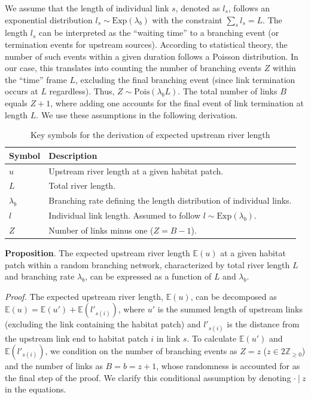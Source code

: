 \documentclass[11pt, class=article, crop=false]{standalone}
\begin{document}
We assume that the length of individual link $s$, denoted as $l_s$, follows an exponential distribution $l_s \sim \mbox{Exp}(\lambda_b)$ with the constraint $\sum_s l_s = L$.
The length $l_s$ can be interpreted as the ``waiting time'' to a branching event (or termination events for upstream sources).
According to statistical theory, the number of such events within a given duration follows a Poisson distribution.
In our case, this translates into counting the number of branching events $Z$ within the ``time'' frame $L$, excluding the final branching event (since link termination occurs at $L$ regardless).
Thus, $Z \sim \mbox{Pois}(\lambda_b L)$.
The total number of links $B$ equals $Z + 1$, where adding one accounts for the final event of link termination at length $L$.
We use these assumptions in the following derivation.

\begin{table}
    \centering
    \caption{Key symbols for the derivation of expected upstream river length}
    \begin{tabularx}{\textwidth}{ll}
        Symbol & Description\\
        \hline
        $u$ & Upstream river length at a given habitat patch.\\
        $L$ & Total river length.\\
        $\lambda_b$ & Branching rate defining the length distribution of individual links.\\
        $l$ & Individual link length. Assumed to follow $l \sim \mbox{Exp}(\lambda_b)$.\\
        $Z$ & Number of links minus one ($Z = B - 1$).\\
        \hline
    \end{tabularx}
    \label{tab:key-symbol}
\end{table}


\textbf{Proposition}.
The expected upstream river length $\mathbb{E}(u)$ at a given habitat patch within a random branching network, characterized by total river length $L$ and branching rate $\lambda_b$, can be expressed as a function of $L$ and $\lambda_b$.

\textit{Proof.}
The expected upstream river length, $\mathbb{E}(u)$, can be decomposed as $\mathbb{E}(u) = \mathbb{E}(u') + \mathbb{E}(l'_{s(i)})$, where $u'$ is the summed length of upstream links (excluding the link containing the habitat patch) and $l'_{s(i)}$ is the distance from the upstream link end to habitat patch $i$ in link $s$.
To calculate $\mathbb{E}(u')$ and $\mathbb{E}(l'_{s(i)})$, we condition on the number of branching events as $Z = z$ ($z \in 2\mathbb{Z}_{\ge 0}$) and the number of links as $B = b = z + 1$, whose randomness is accounted for as the final step of the proof.
We clarify this conditional assumption by denoting $\cdot ~|~ z$ in the equations.
\end{document}
